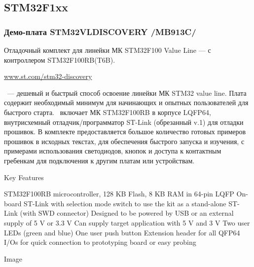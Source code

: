 \subsection{STM32F1xx} 

\subsubsection{Демо-плата STM32VLDISCOVERY /MB913C/}

Отладочный комплект для линейки МК STM32F100 Value Line
--- с контроллером STM32F100RB(T6B).

\url{www.st.com/stm32-discovery}

\vld\ --- дешевый и быстрый способ освоение линейки МК STM32 
value line. 
Плата содержит необходимый минимум для начинающих и опытных пользователей
для быстрого старта.
\vld\ включает МК STM32F100RB в корпусе LQFP64, внутрисхемный 
отладчик/программатор ST-Link (обрезанный v.1) для отладки прошивок.
В комплекте предоставляется большое количество готовых примеров прошивок
в исходных текстах, для обеспечения быстрого запуска и изучения, с примерами
использования светодиодов, кнопок и доступа к контактным гребенкам
для подключения к другим платам или устройствам.



Key Features

    STM32F100RB microcontroller, 128 KB Flash, 8 KB RAM in 64-pin LQFP
    On-board ST-Link with selection mode switch to use the kit as a stand-alone ST-Link (with SWD connector)
    Designed to be powered by USB or an external supply of 5 V or 3.3 V
    Can supply target application with 5 V and 3 V
    Two user LEDs (green and blue)
    One user push button
    Extension header for all QFP64 I/Os for quick connection to prototyping board or easy probing

Image
